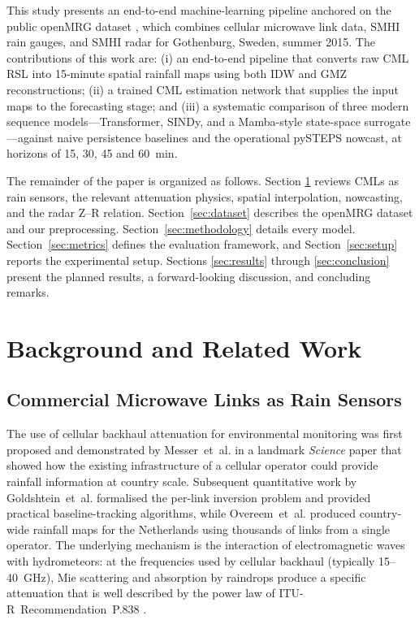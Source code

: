 \documentclass[12pt, a4paper]{article}
\begin{document}
This study presents an end-to-end machine-learning pipeline anchored on
the public openMRG dataset \cite{andersson2023openmrg}, which combines
cellular microwave link data, SMHI rain gauges, and SMHI radar for
Gothenburg, Sweden, summer 2015. The contributions of this work are: (i)
an end-to-end pipeline that converts raw CML RSL into 15-minute
spatial rainfall maps using both IDW and GMZ reconstructions; (ii) a
trained CML estimation network that supplies the input maps to the
forecasting stage; and (iii) a systematic comparison of three modern
sequence models---Transformer, SINDy, and a Mamba-style state-space
surrogate---against naive persistence baselines and the operational
pySTEPS nowcast, at horizons of 15, 30, 45 and 60~min.

The remainder of the paper is organized as follows. Section
\ref{sec:background} reviews CMLs as rain sensors, the relevant
attenuation physics, spatial interpolation, nowcasting, and the radar
Z--R relation. Section~\ref{sec:dataset} describes the openMRG dataset
and our preprocessing. Section~\ref{sec:methodology} details every model.
Section~\ref{sec:metrics} defines the evaluation framework, and
Section~\ref{sec:setup} reports the experimental setup. Sections
\ref{sec:results} through \ref{sec:conclusion} present the planned
results, a forward-looking discussion, and concluding remarks.

\section{Background and Related Work}\label{sec:background}

\subsection{Commercial Microwave Links as Rain Sensors}

The use of cellular backhaul attenuation for environmental monitoring was
first proposed and demonstrated by \mbox{Messer et al.} \cite{messer2006}
in a landmark \emph{Science} paper that showed how the existing
infrastructure of a cellular operator could provide rainfall information
at country scale. Subsequent quantitative work by \mbox{Goldshtein et
al.} \cite{goldshtein2009} formalised the per-link inversion problem and
provided practical baseline-tracking algorithms, while \mbox{Overeem et
al.} \cite{overeem2013} produced country-wide rainfall maps for the
Netherlands using thousands of links from a single operator. The
underlying mechanism is the interaction of electromagnetic waves with
hydrometeors: at the frequencies used by cellular backhaul (typically
15--40~GHz), Mie scattering and absorption by raindrops produce a
specific attenuation that is well described by the
power law of ITU-R~Recommendation~P.838 \cite{ituR838}.
\end{document}
